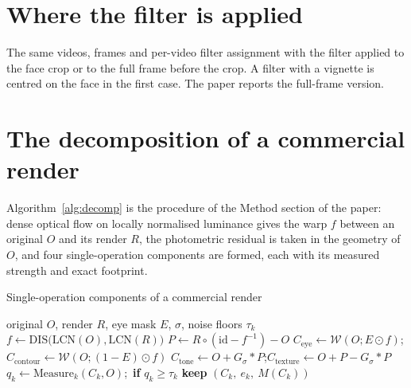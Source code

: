 \documentclass[10pt]{article}
\begin{document}
\section{Where the filter is applied}
\begin{table}[H]
\centering
\caption{The same videos, frames and per-video filter assignment with the filter applied to the face crop or to the full
frame before the crop. A filter with a vignette is centred on the face in the first case. The paper reports the
full-frame version.}
\label{tab:fullframe}
\footnotesize
\begin{adjustbox}{max width=\linewidth}\end{adjustbox}
\end{table}


\section{The decomposition of a commercial render}
Algorithm~\ref{alg:decomp} is the procedure of the Method section of the paper: dense optical flow on locally normalised
luminance gives the warp $f$ between an original $O$ and its render $R$, the photometric residual is taken in the
geometry of $O$, and four single-operation components are formed, each with its measured strength and exact footprint.
\begin{algorithm}[H]
\caption{Single-operation components of a commercial render}
\label{alg:decomp}
\begin{algorithmic}[1]
\Require original $O$, render $R$, eye mask $E$, $\sigma$, noise floors $\tau_k$
\State $f\gets\mathrm{DIS}\big(\mathrm{LCN}(O),\mathrm{LCN}(R)\big)$
\State $P\gets R\circ(\mathrm{id}-f^{-1}) - O$
\State $C_\text{eye}\gets\mathcal{W}(O;E\odot f)$;\quad $C_\text{contour}\gets\mathcal{W}(O;(1-E)\odot f)$
\State $C_\text{tone}\gets O+G_\sigma*P$;\quad $C_\text{texture}\gets O+P-G_\sigma*P$
  \State $q_k\gets\mathrm{Measure}_k(C_k,O)$;\ \textbf{if} $q_k\ge\tau_k$ \textbf{keep} $(C_k,\ e_k,\ M(C_k))$
\EndFor
\end{algorithmic}
\end{algorithm}
\end{document}
